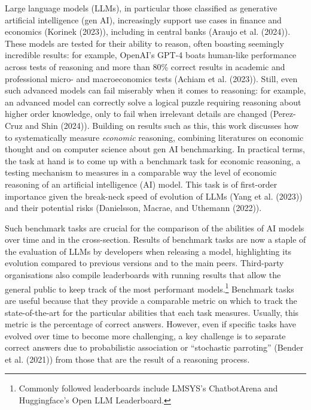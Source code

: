 \documentclass[
]{article}
\theoremstyle{plain}
\theoremstyle{definition}
\theoremstyle{remark}
\begin{document}
Large language models (LLMs), in particular those classified as
generative artificial intelligence (gen AI), increasingly support use
cases in finance and economics (Korinek (2023)), including in central
banks (Araujo et al. (2024)). These models are tested for their ability
to reason, often boasting seemingly incredible results: for example,
OpenAI's GPT-4 boats human-like performance across tests of reasoning
and more than 80\% correct results in academic and professional micro-
and macroeconomics tests (Achiam et al. (2023)). Still, even such
advanced models can fail miserably when it comes to reasoning: for
example, an advanced model can correctly solve a logical puzzle
requiring reasoning about higher order knowledge, only to fail when
irrelevant details are changed (Perez-Cruz and Shin (2024)). Building on
results such as this, this work discusses how to systematically measure
\emph{economic} reasoning, combining literatures on economic thought and
on computer science about gen AI benchmarking. In practical terms, the
task at hand is to come up with a benchmark task for economic reasoning,
a testing mechanism to measures in a comparable way the level of
economic reasoning of an artificial intelligence (AI) model. This task
is of first-order importance given the break-neck speed of evolution of
LLMs (Yang et al. (2023)) and their potential risks (Danielsson, Macrae,
and Uthemann (2022)).

Such benchmark tasks are crucial for the comparison of the abilities of
AI models over time and in the cross-section. Results of benchmark tasks
are now a staple of the evaluation of LLMs by developers when releasing
a model, highlighting its evolution compared to previous versions and to
the main peers. Third-party organisations also compile leaderboards with
running results that allow the general public to keep track of the most
performant models.\footnote{Commonly followed leaderboards include
  LMSYS's ChatbotArena and Huggingface's Open LLM Leaderboard.}
Benchmark tasks are useful because that they provide a comparable metric
on which to track the state-of-the-art for the particular abilities that
each task measures. Usually, this metric is the percentage of correct
answers. However, even if specific tasks have evolved over time to
become more challenging, a key challenge is to separate correct answers
due to probabilistic association or ``stochastic parroting'' (Bender et
al. (2021)) from those that are the result of a reasoning process.
\end{document}
